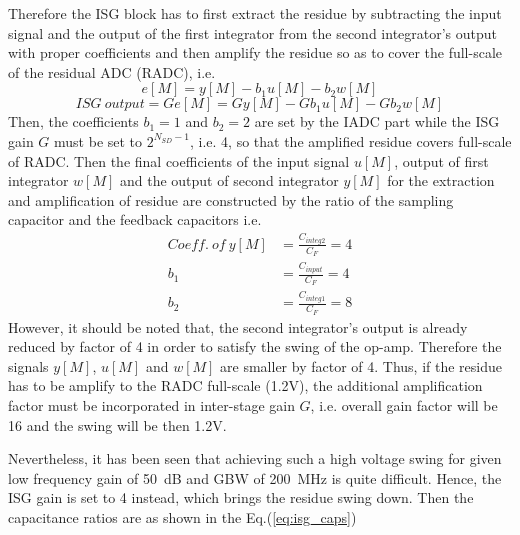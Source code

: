 Therefore the ISG block has to first extract the residue by subtracting the input signal and the output of the first integrator from the second integrator's output with proper coefficients and then amplify the residue so as to cover the full-scale of the residual ADC (RADC), i.e.
%
\begin{equation}
    e[M]=y[M]-b_1u[M]-b_2w[M]
\end{equation}
%
%
\begin{equation}
    ISG\ output = G e[M] = G y[M]-G b_1u[M]-G b_2w[M]
\end{equation}
%
Then, the coefficients $b_1=1$ and $b_2=2$ are set by the IADC part while the ISG gain $G$ must be set to $2^{N_{SD}-1}$, i.e. 4, so that the amplified residue covers full-scale of RADC. Then the final coefficients of the input signal $u[M]$, output of first integrator $w[M]$ and the output of second integrator $y[M]$ for the extraction and amplification of residue are constructed by the ratio of the sampling capacitor and the feedback capacitors i.e.
%
\begin{equation}\label{eq:isg_caps}
    \begin{split}
        Coeff.\ of\ y[M]&=\frac{C_{integ2}}{C_F}=4\\
        b_1&=\frac{C_{input}}{C_F}=4\\
        b_2&=\frac{C_{integ1}}{C_F}=8
    \end{split}
\end{equation}
%
However, it should be noted that, the second integrator's output is already reduced by factor of 4 in order to satisfy the swing of the op-amp. Therefore the signals $y[M]$, $u[M]$ and $w[M]$ are smaller by factor of 4. Thus, if the residue has to be amplify to the RADC full-scale (1.2V), the additional amplification factor must be incorporated in inter-stage gain $G$, i.e. overall gain factor will be 16 and the swing will be then 1.2V. 

Nevertheless, it has been seen that achieving such a high voltage swing for given low frequency gain of 50~dB and GBW of 200~MHz is quite difficult. Hence, the ISG gain is set to 4 instead, which brings the residue swing down. Then the capacitance ratios are as shown in the Eq.(\ref{eq:isg_caps})

